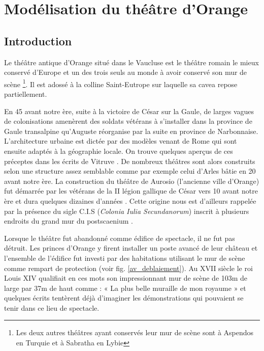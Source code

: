 \part{Modélisation du théâtre d’Orange} \label{part_1}

	\chapter*{Introduction}
	  \label{introarcheo}
	 
			 Le théâtre antique d'Orange situé dans le Vaucluse est le théâtre romain le mieux conservé d'Europe et un des trois seuls au monde à avoir conservé son mur de scène \footnote{Les deux autres théâtres ayant conservés leur mur de scène sont à Aspendos en Turquie et à Sabratha en Lybie}. Il est adossé à la colline Saint-Eutrope sur laquelle sa \gls{cavea} repose partiellement.
			 
			 En 45 avant notre ère, suite à la victoire de César sur la Gaule, de larges vagues de colonisations amenèrent des soldats vétérans à s'installer dans la province de Gaule transalpine qu'Auguste réorganise par la suite en province de Narbonnaise. L'architecture urbaine est dictée par des modèles venant de Rome qui sont ensuite adaptés à la géographie locale. On trouve quelques aperçus de ces préceptes dans les écrits de Vitruve \cite[Livre V]{vitruve}. De nombreux théâtres sont alors construits selon une structure assez semblable comme par exemple celui d'Arles bâtie en 20 avant notre ère. La construction du théâtre de Aurosio (l'ancienne ville d'Orange) fut démarrée par les vétérans de la II légion gallique de César vers 10 avant notre ère et dura quelques dizaines d'années \cite[p. 31]{PouvoirDuTheatre}. Cette origine nous est d'ailleurs rappelée par la présence du sigle C.I.S (\textit{Colonia Iulia Secundanorum}) inscrit à plusieurs endroits du grand mur du \gls{postscaenium} \cite[p26]{formige}.
			 
			 Lorsque le théâtre fut abandonné comme édifice de spectacle, il ne fut pas détruit. Les princes d'Orange y firent installer un poste avancé de leur château et l’ensemble de l’édifice fut investi par des habitations utilisant le mur de scène comme rempart de protection (voir fig. \ref{av_deblaiement}). Au XVII siècle le roi Louis XIV qualifiait en ces mots son impressionnant mur de scène de 103m de large par 37m de haut comme : « La plus belle muraille de mon royaume » \cite[webpage]{siteTheatre} et quelques écrits tentèrent déjà d'imaginer les démonstrations qui pouvaient se tenir dans ce lieu de spectacle. 
			 
